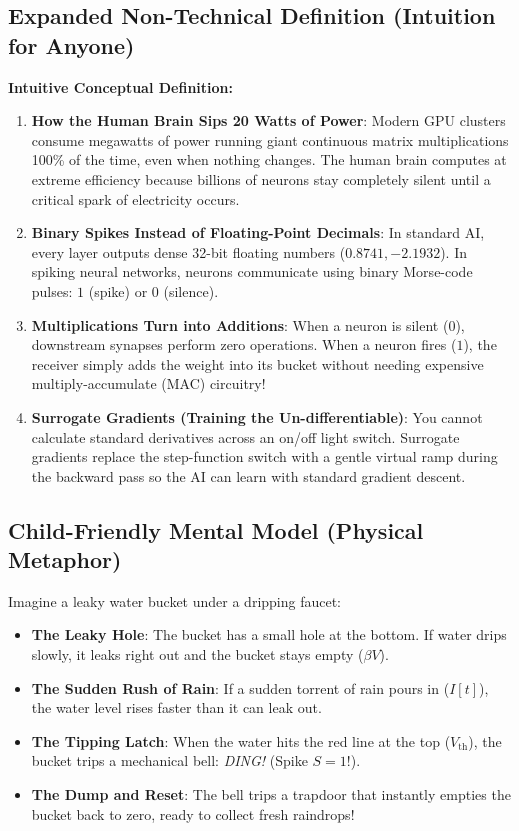 \documentclass[11pt,a4paper]{article}
\theoremstyle{definition}
\begin{document}
\subsection{Expanded Non-Technical Definition (Intuition for Anyone)}
\textbf{Intuitive Conceptual Definition:}
\begin{enumerate}
    \item \textbf{How the Human Brain Sips 20 Watts of Power}: Modern GPU clusters consume megawatts of power running giant continuous matrix multiplications 100\% of the time, even when nothing changes. The human brain computes at extreme efficiency because billions of neurons stay completely silent until a critical spark of electricity occurs.
    \item \textbf{Binary Spikes Instead of Floating-Point Decimals}: In standard AI, every layer outputs dense 32-bit floating numbers ($0.8741, -2.1932$). In spiking neural networks, neurons communicate using binary Morse-code pulses: $1$ (spike) or $0$ (silence).
    \item \textbf{Multiplications Turn into Additions}: When a neuron is silent ($0$), downstream synapses perform zero operations. When a neuron fires ($1$), the receiver simply adds the weight into its bucket without needing expensive multiply-accumulate (MAC) circuitry!
    \item \textbf{Surrogate Gradients (Training the Un-differentiable)}: You cannot calculate standard derivatives across an on/off light switch. Surrogate gradients replace the step-function switch with a gentle virtual ramp during the backward pass so the AI can learn with standard gradient descent.
\end{enumerate}

\subsection{Child-Friendly Mental Model (Physical Metaphor)}
Imagine a leaky water bucket under a dripping faucet:
\begin{itemize}
    \item \textbf{The Leaky Hole}: The bucket has a small hole at the bottom. If water drips slowly, it leaks right out and the bucket stays empty ($\beta V$).
    \item \textbf{The Sudden Rush of Rain}: If a sudden torrent of rain pours in ($I[t]$), the water level rises faster than it can leak out.
    \item \textbf{The Tipping Latch}: When the water hits the red line at the top ($V_{\text{th}}$), the bucket trips a mechanical bell: \emph{DING!} (Spike $S=1$!).
    \item \textbf{The Dump and Reset}: The bell trips a trapdoor that instantly empties the bucket back to zero, ready to collect fresh raindrops!
\end{itemize}
\end{document}
